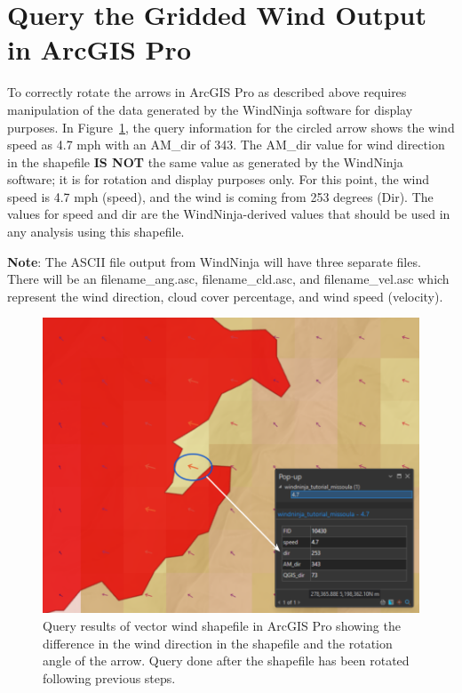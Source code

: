\documentclass[12pt]{article}
\begin{document}
\section*{Query the Gridded Wind Output in ArcGIS Pro}
To correctly rotate the arrows in ArcGIS Pro as described above requires manipulation of the data generated by the WindNinja software for display purposes. In Figure~\ref{fig:Figure14}, the query information for the circled arrow shows the wind speed as 4.7 mph with an AM\_dir of 343. The AM\_dir value for wind direction in the shapefile \textbf{IS NOT} the same value as generated by the WindNinja software; it is for rotation and display purposes only. For this point, the wind speed is 4.7 mph (speed), and the wind is coming from 253 degrees (Dir). The values for speed and dir are the WindNinja-derived values that should be used in any analysis using this shapefile.

\textbf{Note}: The ASCII file output from WindNinja will have three separate files. There will be an filename\_ang.asc, filename\_cld.asc, and filename\_vel.asc which represent the wind direction, cloud cover percentage, and wind speed (velocity). 

\begin{figure}[H]
	\centering
	\includegraphics[scale=0.5]{arc_14.png}
	\caption{Query results of vector wind shapefile in ArcGIS Pro showing the difference in the wind direction in the shapefile and the rotation angle of the arrow. Query done after the shapefile has been rotated following previous steps.}
\label{fig:Figure14}
\end{figure}
\end{document}
